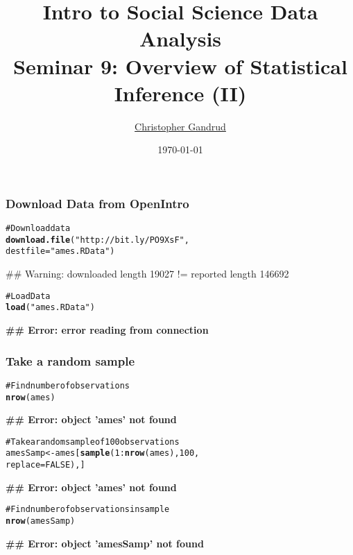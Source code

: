 \documentclass{beamer}\usepackage{graphicx, color}
\title[]{Intro to Social Science Data Analysis \\[1cm] Seminar 9: Overview of Statistical Inference (II)}
\author[]{
    \href{mailto:gandrud@yonsei.ac.kr}{Christopher Gandrud}
}
\date{\today}
\makeatletter
\newcommand{\hlfunctioncall}[1]{\textcolor[rgb]{0.501960784313725,0,0.329411764705882}{\textbf{#1}}}%
\newcommand{\hlstring}[1]{\textcolor[rgb]{0.6,0.6,1}{#1}}%
\newcommand{\hlcomment}[1]{\textcolor[rgb]{0.180392156862745,0.6,0.341176470588235}{#1}}%
\newenvironment{kframe}{%
 \def\at@end@of@kframe{}%
 \ifinner\ifhmode%
  \def\at@end@of@kframe{\end{minipage}}%
  \begin{minipage}{\columnwidth}%
 \fi\fi%
 \def\FrameCommand##1{\hskip\@totalleftmargin \hskip-\fboxsep
 \colorbox{shadecolor}{##1}\hskip-\fboxsep
     \hskip-\linewidth \hskip-\@totalleftmargin \hskip\columnwidth}%
 \MakeFramed {\advance\hsize-\width
   \@totalleftmargin\z@ \linewidth\hsize
   \@setminipage}}%
 {\par\unskip\endMakeFramed%
 \at@end@of@kframe}
\newenvironment{knitrout}{}{} %
\makeatother
\begin{document}
\frame{\titlepage}

\begin{frame}[fragile]
  \frametitle{Download Data from OpenIntro}
\begin{knitrout}
\color{fgcolor}\begin{kframe}
\begin{alltt}
\hlcomment{# Download data}
\hlfunctioncall{download.file}(\hlstring{"http://bit.ly/PO9XsF"}, 
              destfile = \hlstring{"ames.RData"})
\end{alltt}


{\ttfamily\noindent\textcolor{warningcolor}{\#\# Warning: downloaded length 19027 != reported length 146692}}\begin{alltt}

\hlcomment{# Load Data}
\hlfunctioncall{load}(\hlstring{"ames.RData"})
\end{alltt}


{\ttfamily\noindent\bfseries\textcolor{errorcolor}{\#\# Error: error reading from connection}}\end{kframe}
\end{knitrout}

\end{frame}

\begin{frame}[fragile]
  \frametitle{Take a random sample}
\begin{knitrout}
\color{fgcolor}\begin{kframe}
\begin{alltt}
\hlcomment{# Find number of observations}
\hlfunctioncall{nrow}(ames)
\end{alltt}


{\ttfamily\noindent\bfseries\textcolor{errorcolor}{\#\# Error: object 'ames' not found}}\begin{alltt}

\hlcomment{# Take a random sample of 100 observations}
amesSamp <- ames[\hlfunctioncall{sample}(1:\hlfunctioncall{nrow}(ames), 100,
                          replace=FALSE),]
\end{alltt}


{\ttfamily\noindent\bfseries\textcolor{errorcolor}{\#\# Error: object 'ames' not found}}\begin{alltt}

\hlcomment{# Find number of observations in sample}
\hlfunctioncall{nrow}(amesSamp)
\end{alltt}


{\ttfamily\noindent\bfseries\textcolor{errorcolor}{\#\# Error: object 'amesSamp' not found}}\end{kframe}
\end{knitrout}

\end{frame}
\end{document}
